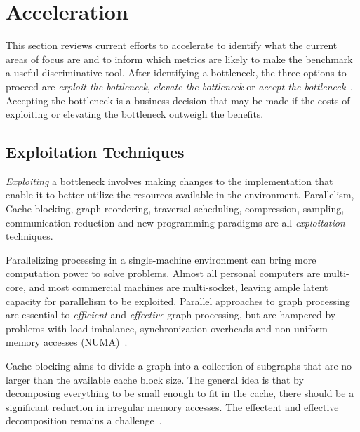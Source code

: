 \section{\gai Acceleration}
\label{section:34-related-gai-acceleration}

This section reviews current efforts to accelerate \gai to identify what the current areas of focus are and to inform which metrics are likely to make the benchmark a useful discriminative tool.
After identifying a bottleneck, the three options to proceed are \textit{exploit the bottleneck}, \textit{elevate the bottleneck} or \textit{accept the bottleneck}~\cite{Goldratt1990,Goldratt2004}.
Accepting the bottleneck is a business decision that may be made if the costs of exploiting or elevating the bottleneck outweigh the benefits. 

\subsection{Exploitation Techniques}
\textit{Exploiting} a bottleneck involves making changes to the implementation that enable it to better utilize the resources available in the environment. 
Parallelism, Cache blocking, graph-reordering, traversal scheduling, compression, sampling, communication-reduction and new programming paradigms are all \textit{exploitation} techniques.

Parallelizing processing in a single-machine environment can bring more computation power to solve problems. 
Almost all personal computers are multi-core, and most commercial machines are multi-socket, leaving ample latent capacity for parallelism to be exploited. 
Parallel approaches to graph processing are essential to \textit{efficient} and \textit{effective}  graph processing, but are hampered by problems with load imbalance, synchronization overheads and non-uniform memory accesses (NUMA)~\cite{Beamer2015}. 

Cache blocking aims to divide a graph into a collection of subgraphs that are no larger than the available cache block size. 
The general idea is that by decomposing everything to be small enough to fit in the cache, there should be a significant reduction in irregular memory accesses. 
The effectent and effective  decomposition remains a challenge~\cite{Balaji2018,Beamer2017, Ham2016, Zhang2020, Sundaram2015}.

